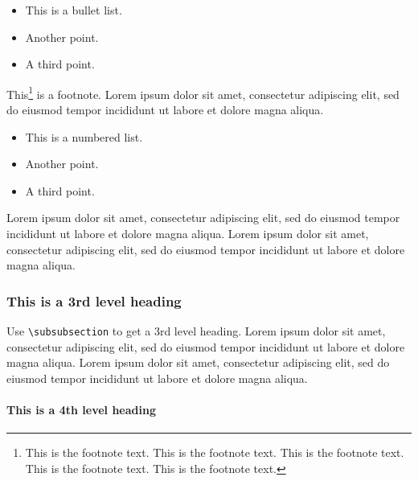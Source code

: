 \documentclass[a4paper,num-refs]{oup-contemporary}
\begin{document}

\begin{itemize}
\item This is a bullet list.
\item Another point.
\item A third point.
\end{itemize}

This\footnote{This is the footnote text. This is the footnote text. This is the footnote text. This is the footnote text. This is the footnote text.} is a footnote. Lorem ipsum dolor sit amet, consectetur adipiscing elit, sed do eiusmod tempor incididunt ut labore et dolore magna aliqua.

\begin{itemize}
\item This is a numbered list.
\item Another point.
\item A third point.
\end{itemize}

Lorem ipsum dolor sit amet, consectetur adipiscing elit, sed do eiusmod tempor incididunt ut labore et dolore magna aliqua. Lorem ipsum dolor sit amet, consectetur adipiscing elit, sed do eiusmod tempor incididunt ut labore et dolore magna aliqua.


\subsubsection{This is a 3rd level heading}

Use \verb|\subsubsection| to get a 3rd level heading.
Lorem ipsum dolor sit amet, consectetur adipiscing elit, sed do eiusmod tempor incididunt ut labore et dolore magna aliqua. Lorem ipsum dolor sit amet, consectetur adipiscing elit, sed do eiusmod tempor incididunt ut labore et dolore magna aliqua. 


\paragraph{This is a 4th level heading}
\end{document}
